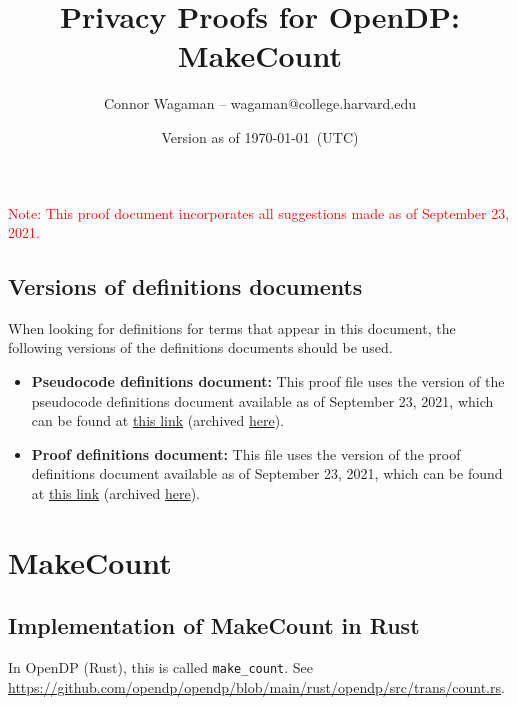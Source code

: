 \documentclass[11pt,letterpaper]{article}
\title{Privacy Proofs for OpenDP: MakeCount}
\author{Connor Wagaman -- wagaman@college.harvard.edu}
\date{Version as of \today~(UTC)}
\newcommand{\inOpenDPRust}[2]{In OpenDP (Rust), this is called \texttt{#1}. See \url{#2}.}
\newcommand{\notebig}[1]{{ \textcolor{red}{{\huge Note:} #1}}}
\theoremstyle{definition}
\begin{document}
\maketitle

\tableofcontents

\notebig{This proof document incorporates all suggestions made as of September 23, 2021.}

\subsection{Versions of definitions documents}
\label{sec:versioned-docs}

When looking for definitions for terms that appear in this document, the following versions of the definitions documents should be used.

\begin{itemize}
    \item \textbf{Pseudocode definitions document:} This proof file uses the version of the pseudocode definitions document available as of September 23, 2021, which can be found at \href{https://github.com/opendp/whitepapers/blob/pseudocode-defns/pseudocode-defns/pseudocode_defns.pdf}{this link} (archived \href{https://web.archive.org/web/20210906201546/https://raw.githubusercontent.com/opendp/whitepapers/pseudocode-defns/pseudocode-defns/pseudocode_defns.pdf}{here}).
    
    \item \textbf{Proof definitions document:} This file uses the version of the proof definitions document available as of September 23, 2021, which can be found at \href{https://github.com/opendp/whitepapers/blob/proof-defns/proof-defns/proof_defns.pdf}{this link} (archived \href{https://web.archive.org/web/20210906201056/https://raw.githubusercontent.com/opendp/whitepapers/proof-defns/proof-defns/proof_defns.pdf}{here}). 
\end{itemize}

\section{MakeCount}

\subsection{Implementation of MakeCount in Rust}
\label{sub:rust-implementation}

\inOpenDPRust{make\_count}{https://github.com/opendp/opendp/blob/main/rust/opendp/src/trans/count.rs}
\end{document}
